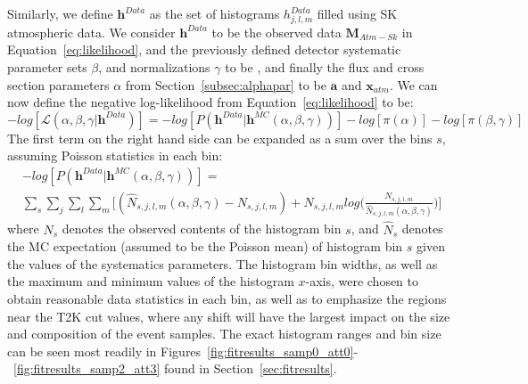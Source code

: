 Similarly, we define $\mathbf{h}^{Data}$ as the set of histograms
$h^{Data}_{j,l,m}$ filled using SK atmospheric data. We consider $
\mathbf{h}^{Data}$ to be the observed data $\mathbf{M}_{Atm-Sk}$ in
Equation~\ref{eq:likelihood}, and the previously defined detector systematic
parameter sets $\beta$, and normalizations $\gamma$ to be \ldsk, and finally
the flux and cross section parameters $\alpha$ from
Section~\ref{subsec:alphapar} to be $\mathbf{a}$ and $\mathbf{x}_{atm}$.  We can now define the
negative log-likelihood from Equation~\ref{eq:likelihood} to be:
%
\begin{equation}
  \label{eq:loglikelihood}
  -log[\mathcal{L}(\alpha,\beta,\gamma | \mathbf{h}^{Data} )] =
  -log[P( \mathbf{h}^{Data} | \mathbf{h}^{MC}(\alpha,\beta,\gamma))] - log[\pi(\alpha)]
  - log[\pi(\beta,\gamma)]
\end{equation}
%
The first term on the right hand side can be expanded as a sum over the bins
$s$, assuming Poisson statistics in each bin:
%
\begin{gather*}
  \label{eq:logpoisson}
  -log[P( \mathbf{h}^{Data} | \mathbf{h}^{MC}(\alpha,\beta,\gamma))] = \\
    \sum\limits_{s}^{} \sum\limits_{j}^{} \sum\limits_{l}^{} \sum\limits_{m}^{} 
   \bigg[ (\hat{N}_{s,j,l,m}(\alpha,\beta,\gamma) - N_{s,j,l,m}) +
  N_{s,j,l,m}log\bigg(\frac{N_{s,j,l,m}}{\hat{N}_{s,j,l,m}(\alpha,\beta,\gamma)}\bigg)\bigg]
\end{gather*}
%
where $N_{s}$ denotes the observed contents of the histogram bin $s$, and
$\hat{N}_{s}$ denotes the MC expectation (assumed to be the Poisson mean) of
histogram bin $s$ given the values of the systematics parameters.  The
histogram bin widths, as well as the maximum and minimum values of the
histogram $x$-axis, were chosen to obtain reasonable data statistics in each
bin, as well as to emphasize the regions near the T2K cut values, where any
shift will have the largest impact on the size and composition of the event
samples.  The exact histogram ranges and bin size can be seen most readily in 
Figures~\ref{fig:fitresults_samp0_att0}-~\ref{fig:fitresults_samp2_att3} found in 
Section~\ref{sec:fitresults}.

